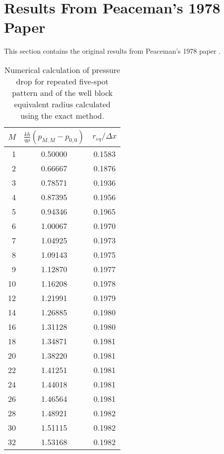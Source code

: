 
\section{Results From Peaceman's 1978 Paper} %
\label{sec:results_from_peaceman_s_1978_paper}
This section contains the original results from Peaceman's 1978 paper \cite{Peaceman1978Interpretation}.

\begin{table}[H]
\centering
    \caption{Numerical calculation of pressure drop for repeated five-spot pattern and of the well block equivalent radius calculated using the exact method.}
    \label{tbl:peaceman-paper-original-results}
    \begin{tabular}{rcc}
        \toprule
        $M$ & $\frac{kh}{q\mu}\left( p_{M,M} - p_{0,0} \right)$ & $r_{eq}/\Delta x$ \\
        \midrule
        1  & 0.50000 & 0.1583 \\
        2  & 0.66667 & 0.1876 \\
        3  & 0.78571 & 0.1936 \\
        4  & 0.87395 & 0.1956 \\
        5  & 0.94346 & 0.1965 \\
        6  & 1.00067 & 0.1970 \\
        7  & 1.04925 & 0.1973 \\
        8  & 1.09143 & 0.1975 \\
        9  & 1.12870 & 0.1977 \\
        10 & 1.16208 & 0.1978 \\
        12 & 1.21991 & 0.1979 \\
        14 & 1.26885 & 0.1980 \\
        16 & 1.31128 & 0.1980 \\
        18 & 1.34871 & 0.1981 \\
        20 & 1.38220 & 0.1981 \\
        22 & 1.41251 & 0.1981 \\
        24 & 1.44018 & 0.1981 \\
        26 & 1.46564 & 0.1981 \\
        28 & 1.48921 & 0.1982 \\
        30 & 1.51115 & 0.1982 \\
        32 & 1.53168 & 0.1982 \\
        \bottomrule
    \end{tabular}
\end{table}



